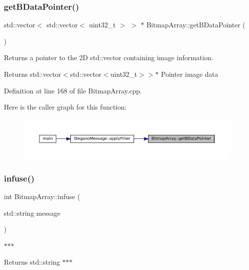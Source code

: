 \subsubsection{\texorpdfstring{getBDataPointer()}{getBDataPointer()}}
{\footnotesize\ttfamily std\+::vector$<$ std\+::vector$<$ uint32\+\_\+t $>$ $>$ $\ast$ Bitmap\+Array\+::get\+B\+Data\+Pointer (\begin{DoxyParamCaption}{ }\end{DoxyParamCaption})}



Returns a pointer to the 2D std\+::vector containing image information. 

\begin{DoxyReturn}{Returns}
std\+::vector$<$std\+::vector$<$uint32\+\_\+t$>$$>$$\ast$ Pointer image data 
\end{DoxyReturn}


Definition at line 168 of file Bitmap\+Array.\+cpp.

Here is the caller graph for this function\+:\nopagebreak
\begin{figure}[H]
\begin{center}
\leavevmode
\includegraphics[width=350pt]{classBitmapArray_ab914d6282460b386b2b5f936190487a2_icgraph}
\end{center}
\end{figure}
\mbox{\label{classBitmapArray_afb549703b79c26499fc443f187bb3d6a}} 
\subsubsection{\texorpdfstring{infuse()}{infuse()}}
{\footnotesize\ttfamily int Bitmap\+Array\+::infuse (\begin{DoxyParamCaption}\item[{std\+::string}]{message }\end{DoxyParamCaption})}



$\ast$$\ast$$\ast$ 

\begin{DoxyReturn}{Returns}
std\+::string $\ast$$\ast$$\ast$ 
\end{DoxyReturn}


